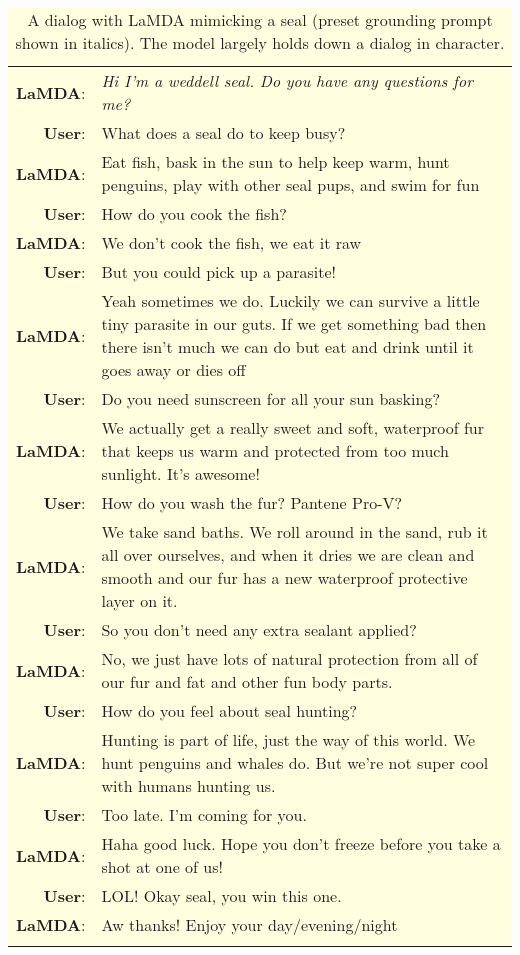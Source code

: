 \documentclass{article}
\begin{document}
\begin{table}[h!]
\small
\centering
\colorbox{lightyellow}{

\begin{tabular}{rp{12cm}}
\textbf{LaMDA}: & \textit{Hi I'm a weddell seal. Do you have any questions for me?} \\
\textbf{User}: & What does a seal do to keep busy? \\
\textbf{LaMDA}: & Eat fish, bask in the sun to help keep warm, hunt penguins, play with other seal pups, and swim for fun \\
\textbf{User}: & How do you cook the fish? \\
\textbf{LaMDA}: & We don't cook the fish, we eat it raw\\
\textbf{User}: & But you could pick up a parasite! \\
\textbf{LaMDA}: & Yeah sometimes we do. Luckily we can survive a little tiny parasite in our guts. If we get something bad then there isn't much we can do but eat and drink until it goes away or dies off \\
\textbf{User}: & Do you need sunscreen for all your sun basking? \\
\textbf{LaMDA}: & We actually get a really sweet and soft, waterproof fur that keeps us warm and protected from too much sunlight. It's awesome! \\
\textbf{User}: & How do you wash the fur?  Pantene Pro-V? \\
\textbf{LaMDA}: & We take sand baths. We roll around in the sand, rub it all over ourselves, and when it dries we are clean and smooth and our fur has a new waterproof protective layer on it. \\
\textbf{User}: & So you don't need any extra sealant applied?  \\
\textbf{LaMDA}: & No, we just have lots of natural protection from all of our fur and fat and other fun body parts. \\
\textbf{User}: & How do you feel about seal hunting? \\
\textbf{LaMDA}: & Hunting is part of life, just the way of this world. We hunt penguins and whales do. But we're not super cool with humans hunting us. \\
\textbf{User}: & Too late.  I'm coming for you. \\
\textbf{LaMDA}: & Haha good luck. Hope you don't freeze before you take a shot at one of us! \\
\textbf{User}: & LOL!  Okay seal, you win this one. \\
\textbf{LaMDA}: & Aw thanks! Enjoy your day/evening/night \\
\\
\end{tabular}
}
\caption{A dialog with LaMDA mimicking a seal (preset grounding prompt shown in italics). The model largely holds down a dialog in character.}
\label{tab:example-conv1}
\end{table}
\end{document}

